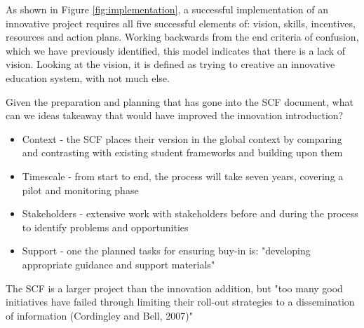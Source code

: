 As shown in Figure \ref{fig:implementation}, a successful implementation of an innovative project requires all five successful elements of: vision, skills, incentives, resources and action plans. Working backwards from the end criteria of confusion, which we have previously identified, this model indicates that there is a lack of vision. Looking at the vision, it is defined as trying to creative an innovative education system, with not much else.

Given the preparation and planning that has gone into the SCF document, what can we ideas takeaway that would have improved the innovation introduction?

\begin{itemize}
\item Context - the SCF places their version in the global context by comparing and contrasting with existing student frameworks and building upon them
\item Timescale - from start to end, the process will take seven years, covering a pilot and monitoring phase
\item Stakeholders - extensive work with stakeholders before and during the process to identify problems and opportunities
\item Support - one the planned tasks for ensuring buy-in is: "developing appropriate guidance and support materials"
\end{itemize}

The SCF is a larger project than the innovation addition, but "too many good initiatives have failed through limiting their roll-out strategies to a dissemination of information (Cordingley and Bell, 2007)" \cite{ADEC2016}
